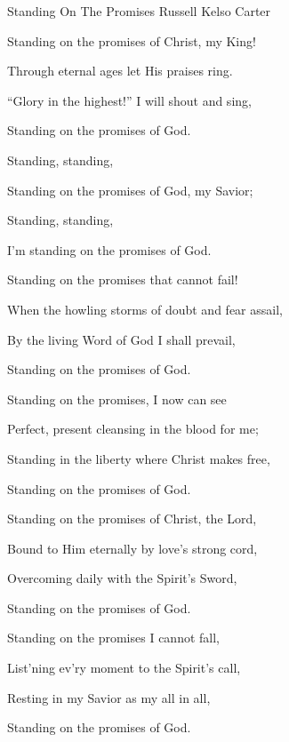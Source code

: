 \documentclass[12pt]{book}
\begin{document}
\begin{song}{Standing On The Promises}{}
  {\SBPubDom}
  {Russell Kelso Carter}
  {}
  {}

  \begin{SBVerse}
    Standing on the promises of Christ, my King!

    Through eternal ages let His praises ring.

    ``Glory in the highest!'' I will shout and sing,

    Standing on the promises of God.
  \end{SBVerse}

  \begin{SBOpGroup}
    Standing, standing,

    Standing on the promises of God, my Savior;

    Standing, standing,

    I'm standing on the promises of God.
  \end{SBOpGroup}

  \begin{SBVerse}
    Standing on the promises that cannot fail!

    When the howling storms of doubt and fear assail,

    By the living Word of God I shall prevail,

    Standing on the promises of God.
  \end{SBVerse}

  \begin{SBVerse}
    Standing on the promises, I now can see

    Perfect, present cleansing in the blood for me;

    Standing in the liberty where Christ makes free,

    Standing on the promises of God.
  \end{SBVerse}

  \begin{SBVerse}
    Standing on the promises of Christ, the Lord,

    Bound to Him eternally by love's strong cord,

    Overcoming daily with the Spirit's Sword,

    Standing on the promises of God.
  \end{SBVerse}

  \begin{SBVerse}
    Standing on the promises I cannot fall,

    List'ning ev'ry moment to the Spirit's call,

    Resting in my Savior as my all in all,

    Standing on the promises of God.
  \end{SBVerse}
\end{song}
\end{document}

